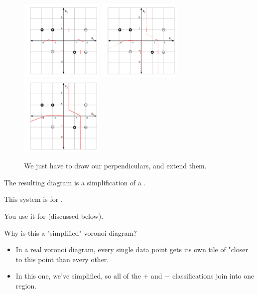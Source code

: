         \begin{figure}[H]
            \centering
            \includegraphics[width=40mm,scale=0.5]{images/nonparametric_images/nn_perpendicular.png}
            \includegraphics[width=40mm,scale=0.5]{images/nonparametric_images/lines_partly_drawn.png}
            \includegraphics[width=40mm,scale=0.5]{images/nonparametric_images/lines_drawn.png}
    
            \caption*{We just have to draw our perpendiculars, and extend them.}
        \end{figure}

        The resulting diagram is a simplification of a .\\

        \begin{clarification}
            This system is for .

            You  use it for  (discussed below).
        \end{clarification}


        Why is this a "simplified" voronoi diagram?

        \begin{itemize}
            \item In a real voronoi diagram, every single data point gets its own tile of "closer to this point than every other.

            \item In this one, we've simplified, so all of the $+$ and $-$ classifications join into one region.
        \end{itemize}


